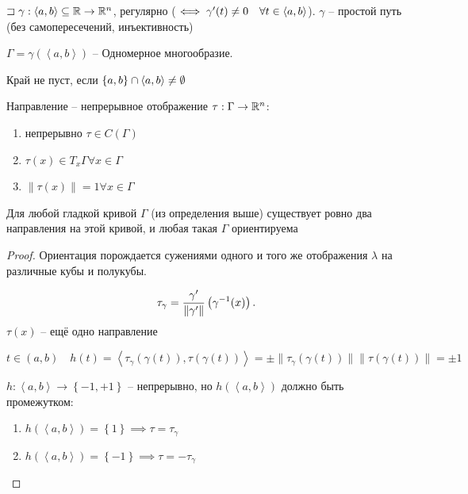 \begin{statement}
    $\sqsupset \gamma: \left<a,b \right>\subseteq \mathbb{R} \to \mathbb{R}^n $, регулярно ($\iff  \gamma^{\prime}(t) \neq 0\quad \forall t\in \left<a,b \right>$). $\gamma$ -- простой путь (без самопересечений, инъективность)

    $\Gamma = \gamma\left( \left<a,b \right> \right) $ -- Одномерное многообразие.

    Край не пуст, если $\left\{ a,b \right\} \cap \left<a,b \right>\neq \emptyset $

    Направление -- непрерывное отображение $\tau:\Gamma \to \mathbb{R}^n$:
    \begin{enumerate}
        \item непрерывно $\tau\in C(\Gamma)$
        \item  $\tau(x) \in T_x\Gamma \forall x\in \Gamma$
        \item $\|\tau(x)\| = 1 \forall x\in \Gamma$
    \end{enumerate}

    Для любой гладкой кривой $\Gamma$ (из определения выше) существует ровно два направления на этой кривой, и любая такая  $\Gamma$ ориентируема
\end{statement}
\begin{proof}
    Ориентация порождается сужениями одного и того же отображения $\lambda$ на различные кубы и полукубы.

    \[
        \tau_\gamma = \frac{\gamma^{\prime}}{\|\gamma^{\prime}\|}\left( \gamma^{-1}(x) \right) 
    .\] 
    $\tau(x)$ -- ещё одно направление

    $t\in \left( a,b \right) \quad h(t) = \left<\tau_\gamma\left( \gamma(t) \right) , \tau(\gamma(t)) \right> = \pm \|\tau_\gamma\left( \gamma(t) \right) \| \|\tau\left( \gamma(t) \right) \| = \pm 1 $

    $h: \left<a,b \right> \to \left\{ -1,+1 \right\} $ -- непрерывно, но $h(\left<a,b \right>)$ должно быть промежутком:
    \begin{enumerate}
        \item $h\left( \left<a,b \right> \right)  = \left\{ 1 \right\} \implies \tau = \tau_\gamma$
        \item $h\left( \left<a,b \right> \right)  = \left\{ -1 \right\} \implies \tau = -\tau_\gamma$
    \end{enumerate}
\end{proof}

